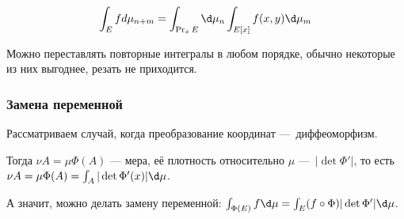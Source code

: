 \documentclass[12pt, a4paper]{article}
\begin{document}
\begin{equation}
  \int_{E} f d \mu_{n + m} = \int_{\Pr_x E} \d \mu_{n} \int_{E[x]} f(x, y) \d \mu_{m}
\end{equation}

Можно переставлять повторные интегралы в любом порядке,
обычно некоторые из них выгоднее, резать не приходится.


\subsubsection{Замена переменной}

Рассматриваем случай, когда преобразование координат — диффеоморфизм.

Тогда $\nu A = \mu \Phi (A)$ — мера, её плотность относительно $\mu$ — $|\det \Phi'|$, то есть $\nu A = \mu \Phi (A) = \int_A |\det \Phi'(x)| \d \mu$.

А значит, можно делать замену переменной: $\int_{\Phi(E)} f \d \mu = \int_E (f \circ \Phi) |\det \Phi'| \d \mu$.
\end{document}
